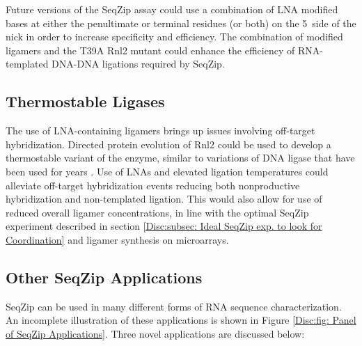     Future versions of the SeqZip assay could use a combination of LNA modified bases \citep{You2006} at either the penultimate or terminal residues (or both) on the 5\textprime~side of the nick in order to increase specificity and efficiency. The combination of modified ligamers and the T39A Rnl2 mutant could enhance the efficiency of RNA-templated DNA-DNA ligations required by SeqZip.

  \subsection{Thermostable Ligases}
    \label{Disc:subsec:Thermostable Ligases}

    The use of LNA-containing ligamers brings up issues involving off-target hybridization. Directed protein evolution of Rnl2 \citep{Stemmer1994, Romero2009a} could be used to develop a thermostable variant of the enzyme, similar to variations of DNA ligase that have been used for years \citep{Barany1991}. Use of LNAs and elevated ligation temperatures could alleviate off-target hybridization events reducing both nonproductive hybridization and non-templated ligation. This would also allow for use of reduced overall ligamer concentrations, in line with the optimal SeqZip experiment described in section \ref{Disc:subsec: Ideal SeqZip exp. to look for Coordination} and ligamer synthesis on microarrays.

  \subsection{Other SeqZip Applications}
    \label{Disc:subsec:Future Uses of SeqZip}

    SeqZip can be used in many different forms of RNA sequence characterization. An incomplete illustration of these applications is shown in Figure \ref{Disc:fig: Panel of SeqZip Applications}. Three novel applications are discussed below:

